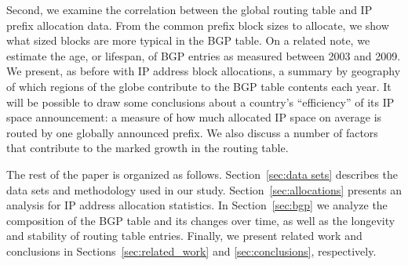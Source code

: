 Second, we examine the correlation between the global routing table and IP
prefix allocation data. From the common prefix block sizes to allocate, we
show what sized blocks are more typical in the BGP table. On a related note,
we estimate the age, or lifespan, of BGP entries as measured between 2003 and
2009. We present, as before with IP address block allocations, a summary by
geography of which regions of the globe contribute to the BGP table contents
each year. It will be possible to draw some conclusions about a country's
``efficiency'' of its IP space announcement: a measure of how much allocated IP space on average is routed by one globally announced prefix.
%
%
We also discuss a number of factors that contribute to the marked growth in
the routing table.

The rest of the paper is organized as follows. Section~\ref{sec:data sets}
describes the data sets and methodology used in our study.
Section~\ref{sec:allocations} presents an analysis for IP address allocation
statistics. In Section~\ref{sec:bgp} we analyze the composition of the BGP
table and its changes over time, as well as the longevity and stability of
routing table entries. Finally, we present related work and conclusions in
Sections~\ref{sec:related_work} and \ref{sec:conclusions}, respectively.

